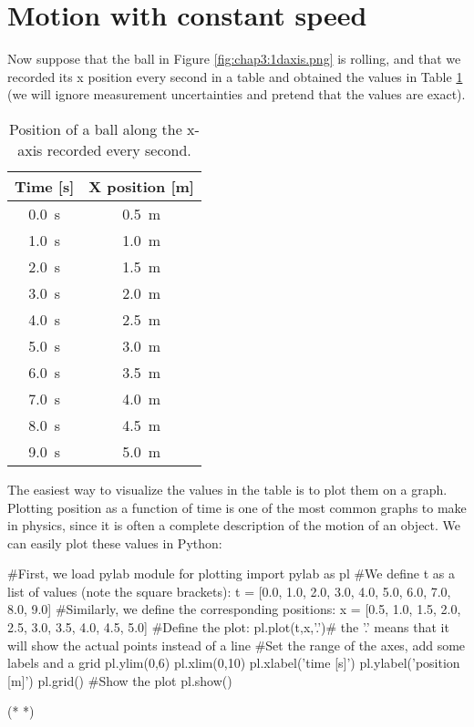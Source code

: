 \section{Motion with constant speed}
Now suppose that the ball in Figure \ref{fig:chap3:1daxis.png} is rolling, and that we recorded its x position every second in a table and obtained the values in Table \ref{tab:chap3:1dmotion} (we will ignore measurement uncertainties and pretend that the values are exact).
\begin{table}[!h]
\centering
\begingroup
\renewcommand{\arraystretch}{1.0}
\begin{tabular}{cc}
\textbf{Time [s]}&\textbf{X position [m]}\\
\hline
\hline
\SI{0.0}{s}& \SI{0.5}{m}\\ \hline
\SI{1.0}{s}& \SI{1.0}{m}\\ \hline
\SI{2.0}{s}& \SI{1.5}{m}\\ \hline
\SI{3.0}{s}& \SI{2.0}{m}\\ \hline
\SI{4.0}{s}& \SI{2.5}{m}\\ \hline
\SI{5.0}{s}& \SI{3.0}{m}\\ \hline
\SI{6.0}{s}& \SI{3.5}{m}\\ \hline
\SI{7.0}{s}& \SI{4.0}{m}\\ \hline
\SI{8.0}{s}& \SI{4.5}{m}\\ \hline
\SI{9.0}{s}& \SI{5.0}{m}\\ \hline
\end{tabular}
\caption{\label{tab:chap3:1dmotion} Position of a ball along the x-axis recorded every second.}
\endgroup
\end{table}
The easiest way to visualize the values in the table is to plot them on a graph. Plotting position as a function of time is one of the most common graphs to make in physics, since it is often a complete description of the motion of an object. We can easily plot these values in Python:
\begin{python}[caption=Plotting position versus time] 
#First, we load pylab module for plotting
import pylab as pl
#We define t as a list of values (note the square brackets):
t = [0.0, 1.0, 2.0, 3.0, 4.0, 5.0, 6.0, 7.0, 8.0, 9.0]
#Similarly, we define the corresponding positions:
x = [0.5, 1.0, 1.5, 2.0, 2.5, 3.0, 3.5, 4.0, 4.5, 5.0]
#Define the plot:
pl.plot(t,x,'.')# the '.' means that it will show the actual points instead of a line
#Set the range of the axes, add some labels and a grid
pl.ylim(0,6)
pl.xlim(0,10)
pl.xlabel('time [s]')
pl.ylabel('position [m]')
pl.grid()
#Show the plot
pl.show()
\end{python}
\begin{poutput}
(*  *)
\end{poutput}


